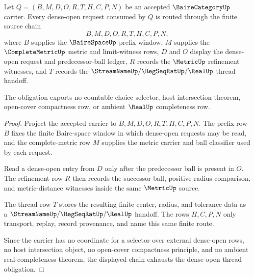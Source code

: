 \begin{theorem}
\label{thm:bairecategory-dense-open-thread-obligation}
Let $Q=(B,M,D,O,R,T,H,C,P,N)$ be an accepted $\BaireCategoryUp$ carrier. Every dense-open request consumed by $Q$ is routed through the finite source chain
$$
B,M,D,O,R,T,H,C,P,N,
$$
where $B$ supplies the $\BaireSpaceUp$ prefix window, $M$ supplies the $\CompleteMetricUp$ metric and limit-witness rows, $D$ and $O$ display the dense-open request and predecessor-ball ledger, $R$ records the $\MetricUp$ refinement witnesses, and $T$ records the $\StreamNameUp/\RegSeqRatUp/\RealUp$ thread handoff.

The obligation exports no countable-choice selector, host intersection theorem, open-cover compactness row, or ambient $\RealUp$ completeness row.
\end{theorem}
\begin{proof}
Project the accepted carrier to $B,M,D,O,R,T,H,C,P,N$. The prefix row $B$ fixes the finite Baire-space window in which dense-open requests may be read, and the complete-metric row $M$ supplies the metric carrier and ball classifier used by each request.

Read a dense-open entry from $D$ only after the predecessor ball is present in $O$. The refinement row $R$ then records the successor ball, positive-radius comparison, and metric-distance witnesses inside the same $\MetricUp$ source.

The thread row $T$ stores the resulting finite center, radius, and tolerance data as a $\StreamNameUp/\RegSeqRatUp/\RealUp$ handoff. The rows $H,C,P,N$ only transport, replay, record provenance, and name this same finite route.

Since the carrier has no coordinate for a selector over external dense-open rows, no host intersection object, no open-cover compactness principle, and no ambient real-completeness theorem, the displayed chain exhausts the dense-open thread obligation.
\end{proof}


